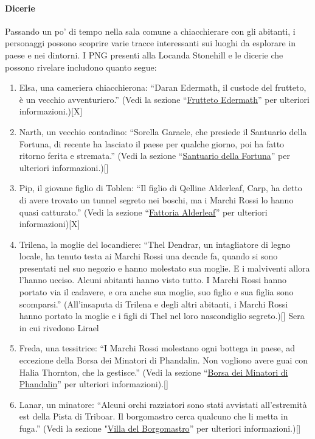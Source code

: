 \documentclass{article}
\begin{document}
\paragraph{Dicerie}
Passando un po’ di tempo nella sala comune a
chiacchierare con gli abitanti, i personaggi possono scoprire
varie tracce interessanti sui luoghi da esplorare in paese e nei
dintorni. I PNG presenti alla Locanda Stonehill e le dicerie
che possono rivelare includono quanto segue:
\begin{enumerate}
    \item Elsa, una cameriera chiacchierona: “Daran Edermath, il
custode del frutteto, è un vecchio avventuriero.” (Vedi la
sezione “\hyperlink{frutteto}{Frutteto Edermath}” per ulteriori informazioni.)[X]
    \item Narth, un vecchio contadino: “Sorella Garaele, che presiede
il Santuario della Fortuna, di recente ha lasciato il paese
per qualche giorno, poi ha fatto ritorno ferita e stremata.”
(Vedi la sezione “\hyperlink{santuario}{Santuario della Fortuna}” per ulteriori
informazioni.)[]
\item Pip, il giovane figlio di Toblen: “Il figlio di Qelline Alderleaf,
Carp, ha detto di avere trovato un tunnel segreto nei boschi,
ma i Marchi Rossi lo hanno quasi catturato.” (Vedi la
sezione “\hyperlink{fattoria}{Fattoria Alderleaf}” per ulteriori informazioni)[X]
\item Trilena, la moglie del locandiere: “Thel Dendrar, un
intagliatore di legno locale, ha tenuto testa ai Marchi Rossi
una decade fa, quando si sono presentati nel suo negozio e
hanno molestato sua moglie. E i malviventi allora l'hanno
ucciso. Alcuni abitanti hanno visto tutto. I Marchi Rossi
hanno portato via il cadavere, e ora anche sua moglie, suo
figlio e sua figlia sono scomparsi.” (All’insaputa di Trilena e
degli altri abitanti, i Marchi Rossi hanno portato la moglie e
i figli di Thel nel loro nascondiglio segreto.)[] Sera in cui rivedono Lirael
\item Freda, una tessitrice: “I Marchi Rossi molestano ogni
bottega in paese, ad eccezione della Borsa dei Minatori di
Phandalin. Non vogliono avere guai con Halia Thornton,
che la gestisce.” (Vedi la sezione “\hyperlink{borsa}{Borsa dei Minatori di
Phandalin}” per ulteriori informazioni).[] 
    \item Lanar, un minatore: “Alcuni orchi razziatori sono stati
avvistati all'estremità est della Pista di Triboar. Il
borgomastro cerca qualcuno che li metta in fuga.” (Vedi la
sezione "\hyperlink{villa}{Villa del Borgomastro}” per ulteriori informazioni.)[]
    


\end{enumerate}
\end{document}

